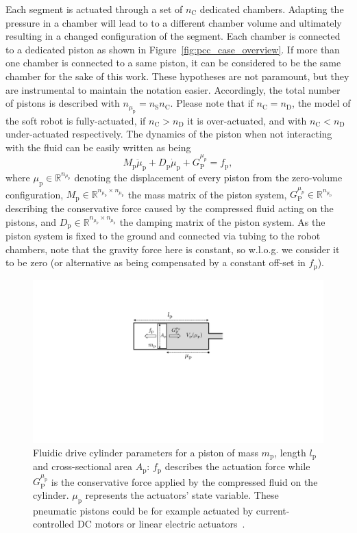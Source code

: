 %
Each segment is actuated through a set of $n_{\mathrm{C}}$ dedicated chambers.
%
Adapting the pressure in a chamber will lead to to a different chamber volume and ultimately resulting in a changed configuration of the segment.
%
Each chamber is connected to a dedicated piston as shown in Figure~\ref{fig:pcc_case_overview}. If more than one chamber is connected to a same piston, it can be considered to be the same chamber for the sake of this work.
%
These hypotheses are not paramount, but they are instrumental to maintain the notation easier.
%
Accordingly, the total number of pistons is described with $n_{\mu_\mathrm{p}} = n_{\mathrm{S}} n_{\mathrm{C}}$.
%
Please note that if $n_\mathrm{C} = n_\mathrm{D}$, the model of the soft robot is fully-actuated, if $n_\mathrm{C} > n_\mathrm{D}$ it is over-actuated, and with $n_\mathrm{C} < n_\mathrm{D}$ under-actuated respectively.
%
The dynamics of the piston when not interacting with the fluid can be easily written as being
%
\begin{equation}
M_\mathrm{p} \ddot{\mu}_\mathrm{p} + D_\mathrm{p} \dot{\mu}_\mathrm{p} + G_{\mathrm{P}}^{\mu_p} = f_\mathrm{p},
\end{equation}
%
where $\mu_\mathrm{p} \in \mathbb{R}^{n_{\mu_\mathrm{p}}}$ denoting the displacement of every piston from the zero-volume configuration, $M_\mathrm{p} \in \mathbb{R}^{n_{\mu_\mathrm{p}} \times n_{\mu_\mathrm{p}}}$ the mass matrix of the piston system, $G_{\mathrm{P}}^{\mu_p} \in \mathbb{R}^{n_{\mu_\mathrm{p}}}$ describing the conservative force caused by the compressed fluid acting on the pistons, and $D_\mathrm{p} \in \mathbb{R}^{n_{\mu_\mathrm{p}} \times n_{\mu_\mathrm{p}}}$ the damping matrix of the piston system. 
As the piston system is fixed to the ground and connected via tubing to the robot chambers, note that the gravity force here is constant, so w.l.o.g. we consider it to be zero (or alternative as being compensated by a constant off\--set in $f_\mathrm{p}$).

\begin{figure}[ht]
  \centering
  \includegraphics[width=0.5\columnwidth]{backstepping/figures/backstepping_graphics_fluidic_drive_cylinder_v4.pdf}
  \caption{Fluidic drive cylinder parameters for a piston of mass $m_\mathrm{p}$, length $l_\mathrm{p}$ and cross-sectional area $A_\mathrm{p}$: $f_\mathrm{p}$ describes the actuation force while $G_\mathrm{P}^{\mu_\mathrm{p}}$ is the conservative force applied by the compressed fluid on the cylinder. $\mu_\mathrm{p}$ represents the actuators' state variable. These pneumatic pistons could be for example actuated by current-controlled DC motors or linear electric actuators~\cite{marchese2014design}.}\label{fig:fluidic_drive_cylinder}
\end{figure}

